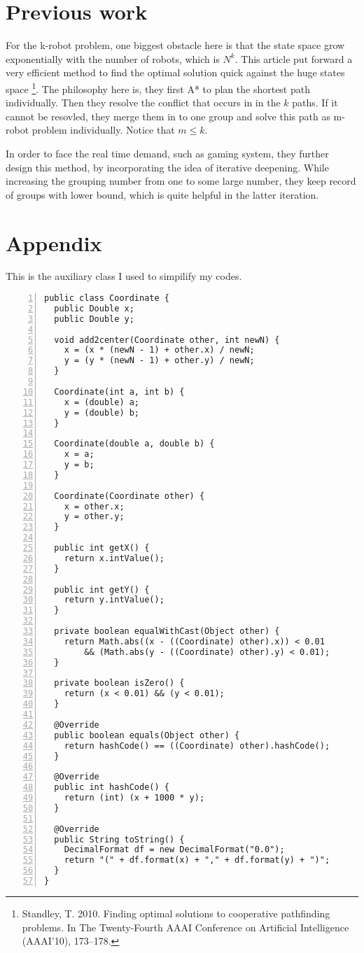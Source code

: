 \documentclass{article}
\begin{document}
\section{Previous work}

For the k-robot problem, one biggest obstacle here is that the state space grow exponentially with the number of robots, which is $N^k$. This article put forward a very efficient method to find the optimal solution quick against the huge states space \footnote{Standley, T. 2010. Finding optimal solutions to cooperative pathfinding problems. In The Twenty-Fourth AAAI Conference on Artificial Intelligence (AAAI’10), 173–178.}.  The philosophy here is, they first A* to plan the shortest path individually. Then they resolve the conflict that occurs in in the $k$ paths. If it cannot be resovled, they merge them in to one group and solve this path as m-robot problem individually. Notice that $m \leq k$. 

In order to face the real time demand, such as gaming system, they further design this method, by incorporating the idea of iterative deepening. While increasing the grouping number from one to some large number, they keep record  of groups with lower bound, which is quite helpful in the latter iteration.

\section{Appendix}
This is the auxiliary class I used to simpilify my codes.
\begin{lstlisting}[numbers=left]
public class Coordinate {
  public Double x;
  public Double y;

  void add2center(Coordinate other, int newN) {
    x = (x * (newN - 1) + other.x) / newN;
    y = (y * (newN - 1) + other.y) / newN;
  }

  Coordinate(int a, int b) {
    x = (double) a;
    y = (double) b;
  }

  Coordinate(double a, double b) {
    x = a;
    y = b;
  }

  Coordinate(Coordinate other) {
    x = other.x;
    y = other.y;
  }

  public int getX() {
    return x.intValue();
  }

  public int getY() {
    return y.intValue();
  }

  private boolean equalWithCast(Object other) {
    return Math.abs((x - ((Coordinate) other).x)) < 0.01
        && (Math.abs(y - ((Coordinate) other).y) < 0.01);
  }

  private boolean isZero() {
    return (x < 0.01) && (y < 0.01);
  }

  @Override
  public boolean equals(Object other) {
    return hashCode() == ((Coordinate) other).hashCode();
  }

  @Override
  public int hashCode() {
    return (int) (x + 1000 * y);
  }

  @Override
  public String toString() {
    DecimalFormat df = new DecimalFormat("0.0");
    return "(" + df.format(x) + "," + df.format(y) + ")";
  }
}
\end{lstlisting}
\end{document}
